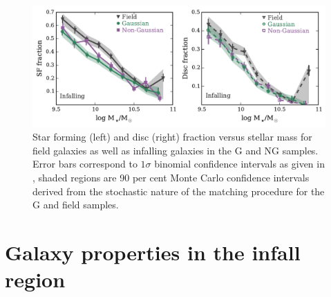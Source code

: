 \documentclass[a4paper,fleqn,usenatbib]{mnras}
\begin{document}
\begin{figure}
  \centering
  \includegraphics[width=\textwidth]{disk_sfFrac95_w2_if.pdf}
  \caption{Star forming (left) and disc (right) fraction versus stellar mass for
    field galaxies as well as infalling galaxies in the G and NG
    samples.  Error bars correspond to $1 \sigma$ binomial confidence
    intervals as given in \citet{cameron2011}, shaded regions are 90
    per cent Monte Carlo confidence intervals derived from the
    stochastic nature of the matching procedure for the G and field samples.}
  \label{fig:disk_sfFrac_if}
\end{figure}

\section{Galaxy properties in the infall region}
\label{sec:infall}
\end{document}
